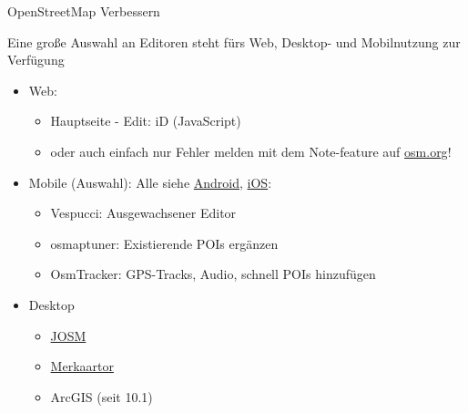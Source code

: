 \documentclass{beamer}
\begin{document}
\begin{frame}{OpenStreetMap Verbessern}

  Eine große Auswahl an Editoren steht fürs Web, Desktop- und Mobilnutzung zur Verfügung

  \begin{itemize}
    \item Web:
    \begin{itemize}
	    \item Hauptseite - Edit: iD (JavaScript)
      \item oder auch einfach nur Fehler melden mit dem Note-feature auf \href{http://osm.org}{osm.org}!
	      \pause
    \end{itemize}
    \item Mobile (Auswahl): Alle siehe  \href{http://wiki.openstreetmap.org/wiki/Android\#OpenStreetMap\_editing\_features}{Android}, \href{http://wiki.openstreetmap.org/wiki/Apple\_iOS\#OpenStreetMap\_editing\_features}{iOS}:
    \begin{itemize}
      \item Vespucci: Ausgewachsener Editor
      \item osmaptuner: Existierende POIs ergänzen
      \item OsmTracker: GPS-Tracks, Audio, schnell POIs hinzufügen
    \end{itemize}
  \item Desktop
    \begin{itemize}
      \item \href{http://josm.openstreetmap.de}{JOSM}
      \item \href{http://merkaartor.be}{Merkaartor}
      \item ArcGIS (seit 10.1)
    \end{itemize}
  \end{itemize}

\end{frame}
\end{document}
